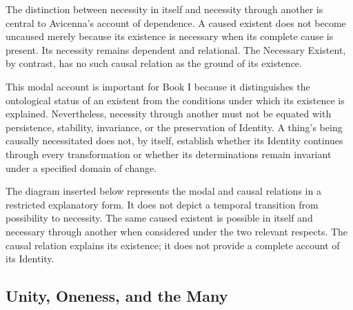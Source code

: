 \label{para:VS.B01.P01.C08.S13.SS08.P003}

The distinction between
necessity in itself and
necessity through another
is central to Avicenna's
account of dependence.
A caused existent does
not become uncaused merely
because its existence is
necessary when its complete
cause is present. Its
necessity remains dependent
and relational. The
Necessary Existent, by
contrast, has no such
causal relation as the
ground of its existence.
\citep[Ilahiyyat, I.6--7; VIII.1--4]{AvicennaMetaphysics}

\label{para:VS.B01.P01.C08.S13.SS08.P004}

This modal account is important
for Book I because it
distinguishes the ontological
status of an existent from
the conditions under which
its existence is explained.
Nevertheless, necessity
through another must not
be equated with persistence,
stability, invariance, or
the preservation of Identity.
A thing's being causally
necessitated does not,
by itself, establish
whether its Identity
continues through every
transformation or whether
its determinations remain
invariant under a specified
domain of change.

\label{para:VS.B01.P01.C08.S13.SS08.P005}

The diagram inserted below
represents the modal and
causal relations in a
restricted explanatory
form. It does not depict
a temporal transition
from possibility to
necessity. The same
caused existent is
possible in itself and
necessary through another
when considered under
the two relevant respects.
The causal relation
explains its existence;
it does not provide
a complete account
of its Identity.





\subsection{Unity, Oneness, and the Many}
\label{subsec:ch08-avicenna-unity}

\label{para:VS.B01.P01.C08.S13.SS09.P001}

